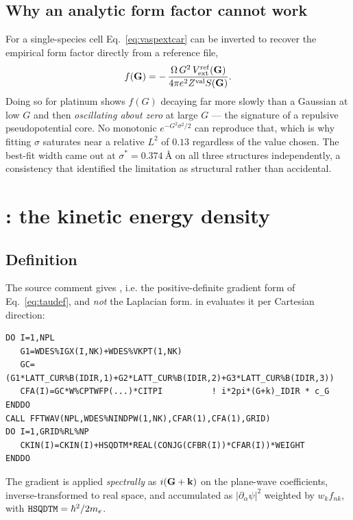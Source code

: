 \subsection{Why an analytic form factor cannot work}

For a single-species cell Eq.~\eqref{eq:vaspextcar} can be inverted to recover
the empirical form factor directly from a reference file,
\begin{equation}
  f(\mathbf{G}) = -\,\frac{\Omega\,G^2\,V_{\mathrm{ext}}^{\mathrm{ref}}(\mathbf{G})}
                   {4\pi e^2 Z^{\mathrm{val}} S(\mathbf{G})} .
\end{equation}
Doing so for platinum shows $f(G)$ decaying far more slowly than a Gaussian at low
$G$ and then \emph{oscillating about zero} at large $G$ --- the signature of a
repulsive pseudopotential core. No monotonic $e^{-G^2\sigma^2/2}$ can reproduce
that, which is why fitting $\sigma$ saturates near a relative $L^2$ of $0.13$
regardless of the value chosen. The best-fit width came out at
$\sigma^{*}=0.374\ \text{\AA}$ on all three structures independently, a
consistency that identified the limitation as structural rather than accidental.

\section{\texorpdfstring{}{TAUCAR}: the kinetic energy density}

\subsection{Definition}

The source comment gives
,
i.e. the positive-definite gradient form of Eq.~\eqref{eq:taudef}, and
\emph{not} the Laplacian form.  in  evaluates it
per Cartesian direction:

\begin{lstlisting}[style=fortran]
DO I=1,NPL
   G1=WDES%IGX(I,NK)+WDES%VKPT(1,NK)
   GC=(G1*LATT_CUR%B(IDIR,1)+G2*LATT_CUR%B(IDIR,2)+G3*LATT_CUR%B(IDIR,3))
   CFA(I)=GC*W%CPTWFP(...)*CITPI          ! i*2pi*(G+k)_IDIR * c_G
ENDDO
CALL FFTWAV(NPL,WDES%NINDPW(1,NK),CFAR(1),CFA(1),GRID)
DO I=1,GRID%RL%NP
   CKIN(I)=CKIN(I)+HSQDTM*REAL(CONJG(CFBR(I))*CFAR(I))*WEIGHT
ENDDO
\end{lstlisting}

The gradient is applied \emph{spectrally} as $i(\mathbf{G}+\mathbf{k})$ on the plane-wave
coefficients, inverse-transformed to real space, and accumulated as
$|\partial_\alpha\psi|^2$ weighted by $w_k f_{nk}$, with
$\texttt{HSQDTM}=\hbar^2/2m_e$.

